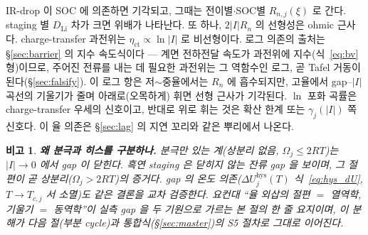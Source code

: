 \documentclass[11pt,a4paper]{article}
\newtheorem*{flagbox}{비고}
\newcommand{\hys}{\mathrm{hys}}
\begin{document}
IR-drop 이 SOC 에 의존하면 기각되고, 그때는 전이별$\cdot$SOC별 $R_{n,j}(\xi)$ 로 간다. staging 별
$D_{\mathrm{Li}}$ 차가 크면 위배가 나타난다. 또 하나, $2|I|R_n$ 의 선형성은 ohmic 근사다. charge-transfer
과전위는 $\eta_\mathrm{ct}\propto\ln|I|$ 로 비선형이다. 로그 의존의 출처는 \S\ref{sec:barrier} 의 지수
속도식이다 — 계면 전하전달 속도가 과전위에 지수(식~\eqref{eq:bv} 형)이므로, 주어진 전류를 내는 데 필요한
과전위는 그 역함수인 로그, 곧 Tafel 거동이 된다(\S\ref{sec:falsify}). 이 로그 항은 저$\sim$중율에서는 $R_n$ 에
흡수되지만, 고율에서 gap--$|I|$ 곡선의 기울기가 줄며 아래로(오목하게) 휘면 선형 근사가 기각된다. $\ln$ 포화
곡률은 charge-transfer 우세의 신호이고, 반대로 위로 휘는 것은 확산 한계 또는 $\gamma_j(|I|)$ 쪽 신호다. 이
율 의존은 \S\ref{sec:lag} 의 지연 꼬리와 같은 뿌리에서 나온다.
\begin{flagbox}
\textbf{왜 분극과 히스를 구분하나.} 분극만 있는 계(상분리 없음, $\Omega_j\le2RT$)는 $|I|\to0$ 에서 gap 이
닫힌다. 흑연 staging 은 닫히지 않는 잔류 gap 을 보이며, 그 절편이 곧 상분리($\Omega_j>2RT$)의 증거다. gap 의
온도 의존($\Delta U_j^\hys(T)$ 식~\eqref{eq:hys_dU}, $T\to T_{c,j}$ 서 소멸)도 같은 결론을 교차 검증한다.
요컨대 ``율 외삽의 절편 $=$ 열역학, 기울기 $=$ 동역학''이 실측 gap 을 두 기원으로 가르는 본 절의 한 줄 요지이며,
이 분해가 다음 절(부분 cycle)과 통합식(\S\ref{sec:master})의 S5 절차로 그대로 이어진다.
\end{flagbox}

\end{document}
